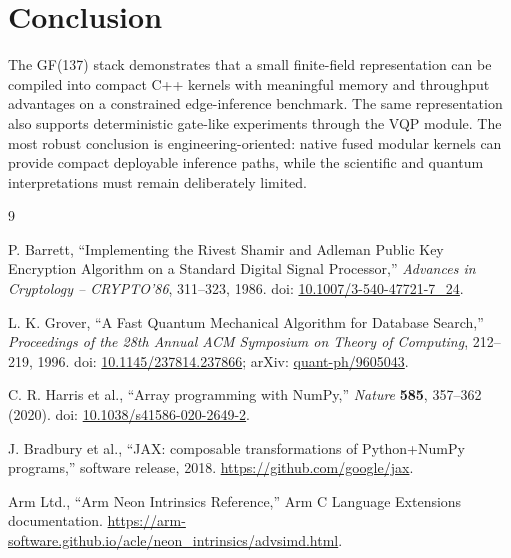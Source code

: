 \documentclass[11pt]{article}
\begin{document}
\section{Conclusion}

The GF(137) stack demonstrates that a small finite-field representation can be
compiled into compact C++ kernels with meaningful memory and throughput
advantages on a constrained edge-inference benchmark.  The same representation
also supports deterministic gate-like experiments through the VQP module.  The
most robust conclusion is engineering-oriented: native fused modular kernels
can provide compact deployable inference paths, while the scientific and
quantum interpretations must remain deliberately limited.

\begin{thebibliography}{9}

P. Barrett,
``Implementing the Rivest Shamir and Adleman Public Key Encryption Algorithm
on a Standard Digital Signal Processor,''
\emph{Advances in Cryptology -- CRYPTO'86}, 311--323, 1986.
doi: \href{https://doi.org/10.1007/3-540-47721-7_24}
{10.1007/3-540-47721-7\_24}.

L. K. Grover,
``A Fast Quantum Mechanical Algorithm for Database Search,''
\emph{Proceedings of the 28th Annual ACM Symposium on Theory of Computing},
212--219, 1996.
doi: \href{https://doi.org/10.1145/237814.237866}
{10.1145/237814.237866};
arXiv: \href{https://arxiv.org/abs/quant-ph/9605043}{quant-ph/9605043}.

C. R. Harris et al.,
``Array programming with NumPy,''
\emph{Nature} \textbf{585}, 357--362 (2020).
doi: \href{https://doi.org/10.1038/s41586-020-2649-2}
{10.1038/s41586-020-2649-2}.

J. Bradbury et al.,
``JAX: composable transformations of Python+NumPy programs,''
software release, 2018.
\url{https://github.com/google/jax}.

Arm Ltd.,
``Arm Neon Intrinsics Reference,''
Arm C Language Extensions documentation.
\url{https://arm-software.github.io/acle/neon_intrinsics/advsimd.html}.

\end{thebibliography}
\end{document}
